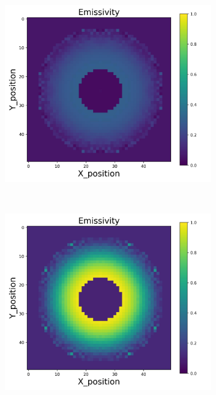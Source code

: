 {\begin{figure}[p]
\begin{minipage}{\textwidth}
\begin{subfigure}{0.325\textwidth}
        \end{subfigure}
        \begin{subfigure}{0.325\textwidth}
            \centering
            \includegraphics[width=\textwidth]{figures/raw_data/21/mix/emi_cal.jpg}
        \end{subfigure}
    \end{minipage}\\
    \begin{minipage}{\textwidth}
        \centering
        \begin{subfigure}{0.325\textwidth}
            \centering
            \includegraphics[width=\textwidth]{figures/raw_data/22/mix/emi_cal.jpg}

\end{subfigure}
\end{minipage}
\end{figure}}
